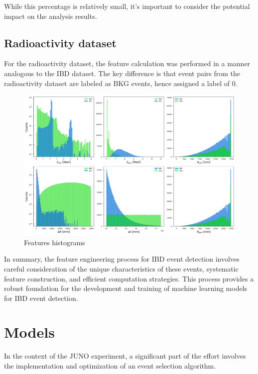 While this percentage is relatively small, it's important to consider the potential impact on the analysis results.

\subsection{Radioactivity dataset}
For the radioactivity dataset, the feature calculation was performed in a manner analogous to the IBD dataset. The key difference is that event pairs from the radioactivity dataset are labeled as BKG events, hence assigned a label of 0.


\begin{figure}[h]
	\centering
	\includegraphics[width=1\linewidth]{Images/hist_features.png}
	\caption{Features histograms}
	\label{fig:hist_features}
\end{figure}



In summary, the feature engineering process for IBD event detection involves careful consideration of the unique characteristics of these events, systematic feature construction, and efficient computation strategies. This process provides a robust foundation for the development and training of machine learning models for IBD event detection.

\section{Models}
In the context of the JUNO experiment, a significant part of the effort involves the implementation and optimization of an event selection algorithm.

